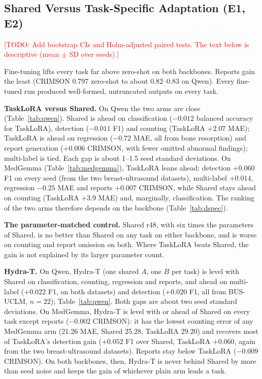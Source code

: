 \documentclass[journal,twoside,web]{ieeecolor}
\newcommand{\todo}[1]{\textcolor{red}{[TODO: #1]}}
\begin{document}
\subsection{Shared Versus Task-Specific Adaptation (E1, E2)}

\todo{Add bootstrap CIs and Holm-adjusted paired tests. The text below is
descriptive (mean $\pm$ SD over seeds).}

Fine-tuning lifts every task far above zero-shot on both backbones. Reports
gain the least (CRIMSON 0.797 zero-shot to about 0.82--0.83 on Qwen).
Every fine-tuned run produced well-formed, untruncated outputs on every task.

\textbf{TaskLoRA versus Shared.} On Qwen the two arms are close
(Table~\ref{tab:qwen}). Shared is ahead on classification ($-0.012$ balanced
accuracy for TaskLoRA), detection ($-0.011$ F1) and counting (TaskLoRA
$+2.07$ MAE); TaskLoRA is ahead on regression ($-0.72$ MAE, all from bone
resorption) and report generation ($+0.006$ CRIMSON, with fewer omitted
abnormal findings); multi-label is tied. Each gap is about 1--1.5 seed
standard deviations. On MedGemma (Table~\ref{tab:medgemma}), TaskLoRA leans
ahead: detection $+0.060$ F1 on every seed (from the two breast-ultrasound
datasets), multi-label $+0.014$, regression $-0.25$ MAE and reports $+0.007$
CRIMSON, while Shared stays ahead on counting (TaskLoRA $+3.9$ MAE) and,
marginally, classification. The ranking of the two arms therefore depends
on the backbone (Table~\ref{tab:dspec}).

\textbf{The parameter-matched control.} Shared r48, with six times the
parameters of Shared, is no better than Shared on any task on either
backbone, and is worse on counting and report omission on both. Where
TaskLoRA beats Shared, the gain is not explained by its larger parameter
count.

\textbf{Hydra-T.} On Qwen, Hydra-T (one shared $A$, one $B$ per task) is
level with Shared on classification, counting, regression and reports, and
ahead on multi-label ($+0.022$ F1, on both datasets) and detection ($+0.020$
F1, all from BUS-UCLM, $n=22$); Table~\ref{tab:qwen}. Both gaps are about two
seed standard deviations. On MedGemma, Hydra-T is level with or ahead of
Shared on every task except reports ($-0.002$ CRIMSON): it has the lowest
counting error of any MedGemma arm (21.26 MAE, Shared 25.28, TaskLoRA 29.20)
and recovers most of TaskLoRA's detection gain ($+0.052$ F1 over Shared,
TaskLoRA $+0.060$, again from the two breast-ultrasound datasets). Reports
stay below TaskLoRA ($-0.009$ CRIMSON). On both backbones, then, Hydra-T is
never behind Shared by more than seed noise and keeps the gain of whichever
plain arm leads a task.
\end{document}
